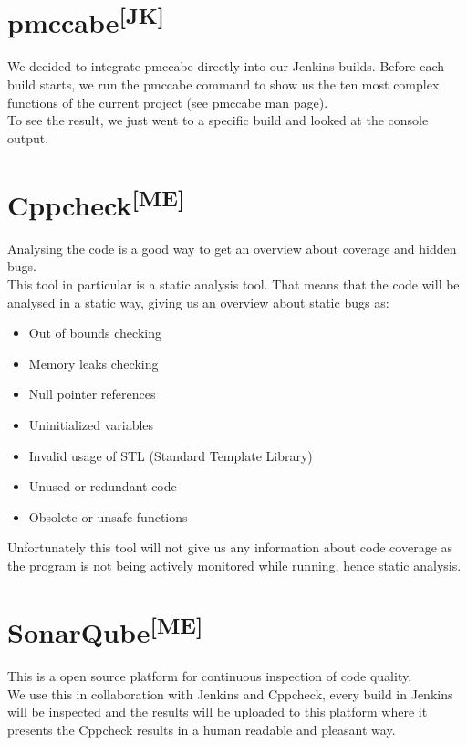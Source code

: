 \section[pmccabe]{pmccabe\textsuperscript{[JK]}}
We decided to integrate pmccabe directly into our Jenkins builds. Before each
build starts, we run the pmccabe command to show us the ten most complex
functions of the current project (see pmccabe man page).\\
To see the result, we just went to a specific build and looked at the console
output.

\section[Cppcheck]{Cppcheck\textsuperscript{[ME]}}
Analysing the code is a good way to get an overview about coverage and hidden
bugs.\\
This tool in particular is a static analysis tool. That means that the code will
be analysed in a static way, giving us an overview about static bugs as:
\begin{itemize}
   \item Out of bounds checking
   \item Memory leaks checking
   \item Null pointer references
   \item Uninitialized variables
   \item Invalid usage of STL (Standard Template Library)
   \item Unused or redundant code
   \item Obsolete or unsafe functions
\end{itemize}
Unfortunately this tool will not give us any information about code coverage as
the program is not being actively monitored while running, hence static
analysis.

\section[SonarQube]{SonarQube\textsuperscript{[ME]}}
This is a open source platform for continuous inspection of code quality.\\
We use this in collaboration with Jenkins and Cppcheck, every build in Jenkins
will be inspected and the results will be uploaded to this platform where it
presents the Cppcheck results in a human readable and pleasant way.\\

